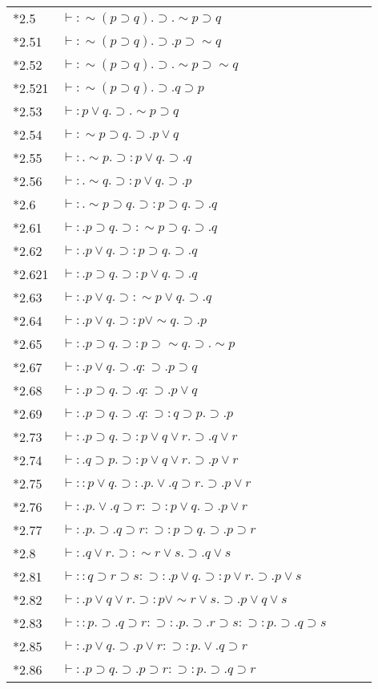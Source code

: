 \noindent\begin{tabular}[t]{l@{\quad}l@{\quad}l@{\quad}ll}
{*2.5} & $\vdash:\sim(p\supset{q}).\supset.\sim{p}\supset{q}$\\
{*2.51} & $\vdash:\sim(p\supset{q}).\supset.p\supset\sim{q}$\\
{*2.52} & $\vdash:\sim(p\supset{q}).\supset.\sim{p}\supset\sim{q}$\\
{*2.521} & $\vdash:\sim(p\supset{q}).\supset.q\supset{p}$\\
{*2.53} & $\vdash:p\vee{q}.\supset.\sim{p}\supset{q}$\\
{*2.54} & $\vdash:\sim{p}\supset{q}.\supset.p\vee{q}$\\
{*2.55} & $\vdash:.\sim{p}.\supset:p\vee{q}.\supset.q$\\
{*2.56} & $\vdash:.\sim{q}.\supset:p\vee{q}.\supset.p$\\
{*2.6} & $\vdash:.\sim{p}\supset{q}.\supset:p\supset{q}.\supset.q$\\
{*2.61} & $\vdash:.p\supset{q}.\supset:\sim{p}\supset{q}.\supset.q$\\
{*2.62} & $\vdash:.p\vee{q}.\supset:p\supset{q}.\supset.q$\\
{*2.621} & $\vdash:.p\supset{q}.\supset:p\vee{q}.\supset.q$\\
{*2.63} & $\vdash:.p\vee{q}.\supset:\sim{p}\vee{q}.\supset.q$\\
{*2.64} & $\vdash:.p\vee{q}.\supset:p\vee\sim{q}.\supset.p$\\
{*2.65} & $\vdash:.p\supset{q}.\supset:p\supset\sim{q}.\supset.\sim{p}$\\
{*2.67} & $\vdash:.p\vee{q}.\supset.q:\supset.p\supset{q}$\\
{*2.68} & $\vdash:.p\supset{q}.\supset.q:\supset.p\vee{q}$\\
{*2.69} & $\vdash:.p\supset{q}.\supset.q:\supset:q\supset{p}.\supset.p$\\
{*2.73} & $\vdash:.p\supset{q}.\supset:p\vee{q}\vee{r}.\supset.q\vee{r}$\\
{*2.74} & $\vdash:.q\supset{p}.\supset:p\vee{q}\vee{r}.\supset.p\vee{r}$\\
{*2.75} & $\vdash::p\vee{q}.\supset:.p.\vee.q\supset{r}.\supset.p\vee{r}$\\
{*2.76} & $\vdash:.p.\vee.q\supset{r}:\supset:p\vee{q}.\supset.p\vee{r}$\\
{*2.77} & $\vdash:.p.\supset.q\supset{r}:\supset:p\supset{q}.\supset.p\supset{r}$\\
{*2.8} & $\vdash:.q\vee{r}.\supset:\sim{r}\vee{s}.\supset.q\vee{s}$\\
{*2.81} & $\vdash::q\supset{r\supset{s}}:\supset:.p\vee{q}.\supset:p\vee{r}.\supset.p\vee{s}$\\
{*2.82} & $\vdash:.p\vee{q}\vee{r}.\supset:p\vee\sim{r}\vee{s}.\supset.p\vee{q}\vee{s}$\\
{*2.83} & $\vdash::p.\supset.q\supset{r}:\supset:.p.\supset.r\supset{s}:\supset:p.\supset.q\supset{s}$\\
{*2.85} & $\vdash:.p\vee{q}.\supset.p\vee{r}:\supset:p.\vee.q\supset{r}$\\
{*2.86} & $\vdash:.p\supset{q}.\supset.p\supset{r}:\supset:p.\supset.q\supset{r}$\\
\end{tabular}